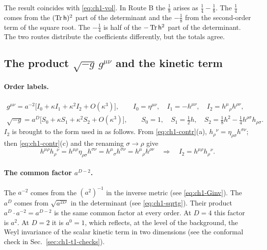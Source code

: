 The result coincides with \eqref{eq:ch1-vol}. In Route B the $\tfrac18$ arises
as $\tfrac14-\tfrac18$. The $\tfrac14$ comes from the $(\operatorname{Tr}\mathsf{h})^2$ part of the
determinant and the $-\tfrac18$ from the second-order term of the square root.
The $-\tfrac14$ is half of the $-\operatorname{Tr}\mathsf{h}^2$ part of the determinant. The two
routes distribute the coefficients differently, but the totals agree.

\subsection{The product \texorpdfstring{$\sqrt{-g}\,g^{\mu\nu}$}{sqrt(-g) g\textasciicircum\{mu nu\}} and the kinetic term}
\label{sec:ch1-t1-product}

\paragraph{Order labels.} \tD
\begin{gather}
g^{\mu\nu}=a^{-2}\big[I_0+\kappa I_1+\kappa^2I_2+O(\kappa^3)\big],\qquad I_0=\eta^{\mu\nu},\quad I_1=-h^{\mu\nu},\quad I_2=h^\mu{}_\rho h^{\rho\nu},
\label{eq:ch1-Ilabels}\\
\sqrt{-g}=a^D\big[S_0+\kappa S_1+\kappa^2S_2+O(\kappa^3)\big],\qquad S_0=1,\quad S_1=\tfrac12h,\quad S_2=\tfrac18h^2-\tfrac14h^{\rho\sigma}h_{\rho\sigma}.
\label{eq:ch1-Slabels}
\end{gather}
$I_2$ is brought to the form used in  as follows. From
\eqref{eq:ch1-contr}(a), $h_\rho{}^\nu=\eta_{\rho\sigma}h^{\sigma\nu}$; then
\eqref{eq:ch1-contr}(c) and the renaming $\sigma\to\rho$ give
\begin{equation}
h^{\mu\rho}h_\rho{}^\nu=h^{\mu\rho}\eta_{\rho\sigma}h^{\sigma\nu}=h^\mu{}_\sigma h^{\sigma\nu}=h^\mu{}_\rho h^{\rho\nu}\quad\Longrightarrow\quad I_2=h^{\mu\rho}h_\rho{}^\nu.
\label{eq:ch1-I2form}
\end{equation}

\paragraph{The common factor $a^{D-2}$.} The $a^{-2}$ comes from the $(a^2)^{-1}$
in the inverse metric (see \eqref{eq:ch1-Ginv}). The $a^D$ comes from
$\sqrt{a^{2D}}$ in the determinant (see \eqref{eq:ch1-sqrtg}). Their product
$a^D\cdot a^{-2}=a^{D-2}$ is the same common factor at every order. At $D=4$
this factor is $a^2$. At $D=2$ it is $a^0=1$, which reflects, at the level of
the background, the Weyl invariance of the scalar kinetic term in two
dimensions (see the conformal check in Sec.~\ref{sec:ch1-t1-checks}).

